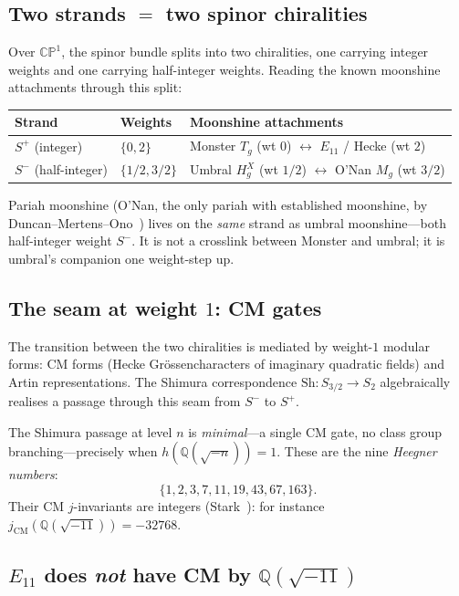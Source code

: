 \documentclass[11pt,a4paper]{article}
\theoremstyle{plain}
\theoremstyle{definition}
\theoremstyle{remark}
\numberwithin{equation}{section}
\begin{document}
\subsection*{Two strands $=$ two spinor chiralities}

Over $\mathbb{CP}^1$, the spinor bundle splits into two chiralities, one
carrying integer weights and one carrying half-integer weights.  Reading the
known moonshine attachments through this split:
\begin{center}
\begin{tabular}{@{}lll@{}}\hline
\textbf{Strand} & \textbf{Weights} & \textbf{Moonshine attachments} \\\hline
$S^{+}$ (integer)      & $\{0, 2\}$  & Monster $T_{g}$ (wt $0$) $\leftrightarrow$ $E_{11}$ / Hecke (wt $2$) \\
$S^{-}$ (half-integer) & $\{1/2,3/2\}$ & Umbral $H^{X}_{g}$ (wt $1/2$) $\leftrightarrow$ O'Nan $M_{g}$ (wt $3/2$) \\\hline
\end{tabular}
\end{center}
Pariah moonshine (O'Nan, the only pariah with established moonshine, by
Duncan--Mertens--Ono~\cite{DMO2017}) lives on the \emph{same} strand as
umbral moonshine---both half-integer weight $S^{-}$.  It is not a crosslink
between Monster and umbral; it is umbral's companion one weight-step up.

\subsection*{The seam at weight $1$: CM gates}

The transition between the two chiralities is mediated by weight-$1$ modular
forms: CM forms (Hecke Gr\"ossencharacters of imaginary quadratic fields) and
Artin representations.  The Shimura correspondence
$\mathrm{Sh}\colon S_{3/2}\to S_{2}$ algebraically realises a passage through
this seam from $S^{-}$ to $S^{+}$.

The Shimura passage at level $n$ is \emph{minimal}---a single CM gate, no class
group branching---precisely when $h(\mathbb{Q}(\sqrt{-n}))=1$.  These are the
nine \emph{Heegner numbers}:
\[
  \{1,2,3,7,11,19,43,67,163\}.
\]
Their CM $j$-invariants are integers (Stark~\cite{Stark1967}): for instance
$j_{\mathrm{CM}}(\mathbb{Q}(\sqrt{-11}))=-32768$.

\subsection*{$E_{11}$ does \emph{not} have CM by $\mathbb{Q}(\sqrt{-11})$}
\end{document}
